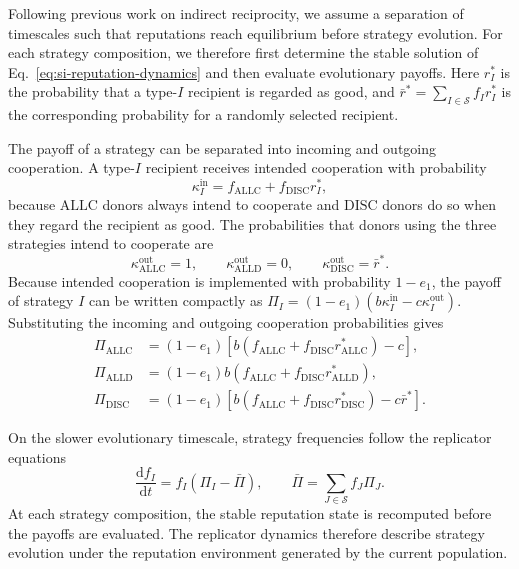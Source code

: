 \documentclass[fleqn,10pt]{wlscirep}
\begin{document}
Following previous work on indirect reciprocity, we assume a separation of timescales such that reputations reach equilibrium before strategy evolution. For each strategy composition, we therefore first determine the stable solution of Eq.~\eqref{eq:si-reputation-dynamics} and then evaluate evolutionary payoffs. Here $r_I^*$ is the probability that a type-$I$ recipient is regarded as good, and $\bar r^*=\sum_{I\in\mathcal S}f_Ir_I^*$ is the corresponding probability for a randomly selected recipient.

The payoff of a strategy can be separated into incoming and outgoing cooperation. A type-$I$ recipient receives intended cooperation with probability
\[
\kappa_I^{\mathrm{in}}=f_{\mathrm{ALLC}}+f_{\mathrm{DISC}}r_I^*,
\]
because $\mathrm{ALLC}$ donors always intend to cooperate and $\mathrm{DISC}$ donors do so when they regard the recipient as good. The probabilities that donors using the three strategies intend to cooperate are
\[
\kappa_{\mathrm{ALLC}}^{\mathrm{out}}=1,
\qquad
\kappa_{\mathrm{ALLD}}^{\mathrm{out}}=0,
\qquad
\kappa_{\mathrm{DISC}}^{\mathrm{out}}=\bar r^*.
\]
Because intended cooperation is implemented with probability $1-e_1$, the payoff of strategy $I$ can be written compactly as $\Pi_I=(1-e_1)(b\kappa_I^{\mathrm{in}}-c\kappa_I^{\mathrm{out}})$. Substituting the incoming and outgoing cooperation probabilities gives
\begin{equation}
\begin{aligned}
\Pi_{\mathrm{ALLC}}
&=(1-e_1)\left[b\left(f_{\mathrm{ALLC}}+f_{\mathrm{DISC}}r_{\mathrm{ALLC}}^*\right)-c\right],\\
\Pi_{\mathrm{ALLD}}
&=(1-e_1)b\left(f_{\mathrm{ALLC}}+f_{\mathrm{DISC}}r_{\mathrm{ALLD}}^*\right),\\
\Pi_{\mathrm{DISC}}
&=(1-e_1)\left[b\left(f_{\mathrm{ALLC}}+f_{\mathrm{DISC}}r_{\mathrm{DISC}}^*\right)-c\bar r^*\right].
\end{aligned}
\label{eq:si-payoffs}
\end{equation}

On the slower evolutionary timescale, strategy frequencies follow the replicator equations
\begin{equation}
\frac{\mathrm df_I}{\mathrm dt}
=f_I(\Pi_I-\bar\Pi),
\qquad
\bar\Pi=\sum_{J\in\mathcal S}f_J\Pi_J.
\label{eq:si-replicator-dynamics}
\end{equation}
At each strategy composition, the stable reputation state is recomputed before the payoffs are evaluated. The replicator dynamics therefore describe strategy evolution under the reputation environment generated by the current population.
\end{document}
